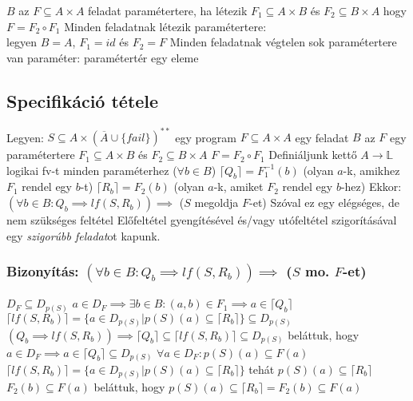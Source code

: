 \documentclass[12pt,a4paper]{article}
\begin{document}
\begin{outline}
	\1 $B$ az $F \subseteq A \times A$ feladat paramétertere, ha
		\2 létezik $F_1 \subseteq A \times B$ és $F_2 \subseteq B \times A$
		\2 hogy $F = F_2 \circ F_1$
	\1 Minden feladatnak létezik paramétertere:\\
	legyen $B=A$, $F_1 = id$ és $F_2 = F$
	\1 Minden feladatnak végtelen sok paramétertere van
	\1 paraméter: paramétertér egy eleme
\end{outline}

\subsection{Specifikáció tétele}

\begin{outline}
	\1 Legyen:
		\2 $S \subseteq A \times (\overline{A} \cup \{fail\})^{**}$ egy program
		\2 $F \subseteq A \times A$ egy feladat
		\2 $B$ az $F$ egy paramétertere
			\3 $F_1 \subseteq A \times B$ és $F_2 \subseteq B \times A$
			\3 $F = F_2 \circ F_1$
	\1 Definiáljunk kettő $A \to \mathbb{L}$ logikai fv-t minden paraméterhez ($\forall b \in B$)
		\2 $\lceil Q_b \rceil = F_1^{-1}(b)$ (olyan $a$-k, amikhez $F_1$ rendel egy $b$-t)
		\2 $\lceil R_b \rceil = F_2(b)$ (olyan $a$-k, amiket $F_2$ rendel egy $b$-hez)
	\1 Ekkor: $(\forall b \in B: Q_b \implies lf(S,R_b)) \implies$ ($S$ megoldja $F$-et)
	\1 Szóval ez egy elégséges, de nem szükséges feltétel
	\1 Előfeltétel gyengítésével és/vagy utófeltétel szigorításával egy \textit{szigorúbb feladat}ot kapunk.
\end{outline}

\pagebreak

\subsubsection{Bizonyítás: $(\forall b \in B: Q_b \implies lf(S,R_b)) \implies$ ($S$ mo. $F$-et)}

\begin{outline}
	\1 $D_F \subseteq D_{p(S)}$
		\2 $a \in D_F \implies \exists b \in B: (a,b) \in F_1 \implies a \in \lceil Q_b \rceil$
		\2 $\lceil lf(S,R_b) \rceil = \{a \in D_{p(S)} | p(S)(a) \subseteq \lceil R_b \rceil\} \subseteq D_{p(S)}$
		\2 $(Q_b \implies lf(S,R_b)) \implies \lceil Q_b \rceil \subseteq \lceil lf(S,R_b) \rceil \subseteq D_{p(S)}$
		\2 beláttuk, hogy $a \in D_F \implies a \in \lceil Q_b \rceil \subseteq D_{p(S)}$
	\1 $\forall a \in D_F: p(S)(a) \subseteq F(a)$
		\2 $\lceil lf(S,R_b) \rceil = \{a \in D_{p(S)} | p(S)(a) \subseteq \lceil R_b \rceil\}$
			\3 tehát $p(S)(a) \subseteq \lceil R_b \rceil$
		\2 $F_2(b) \subseteq F(a)$
		\2 beláttuk, hogy $p(S)(a) \subseteq \lceil R_b \rceil = F_2(b) \subseteq F(a)$
\end{outline}
\end{document}
